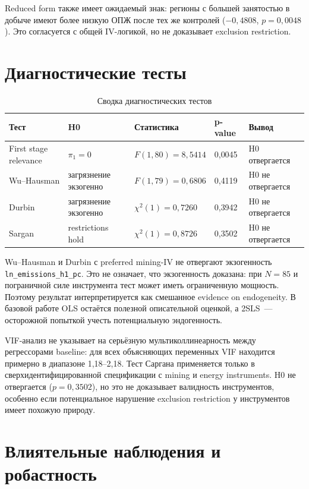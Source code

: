 \documentclass[11pt,a4paper]{article}
\begin{document}
Reduced form также имеет ожидаемый знак: регионы с большей занятостью в добыче имеют более низкую ОПЖ после тех же контролей ($-0{,}4808$, $p=0{,}0048$). Это согласуется с общей IV-логикой, но не доказывает exclusion restriction.

\section{Диагностические тесты}

\begin{table}[H]
\centering
\caption{Сводка диагностических тестов}
\label{tab:tests}
\small
\setlength{\tabcolsep}{3pt}
\begin{tabular}{p{}p{}p{}p{}p{}}
\toprule
\textbf{Тест} & \textbf{H0} & \textbf{Статистика} & \textbf{p-value} & \textbf{Вывод} \\
\midrule
First stage relevance & $\pi_1=0$ & $F(1,80)=8{,}5414$ & 0{,}0045 & H0 отвергается \\
Wu--Hausman & загрязнение экзогенно & $F(1,79)=0{,}6806$ & 0{,}4119 & H0 не отвергается \\
Durbin & загрязнение экзогенно & $\chi^2(1)=0{,}7260$ & 0{,}3942 & H0 не отвергается \\
Sargan & restrictions hold & $\chi^2(1)=0{,}8726$ & 0{,}3502 & H0 не отвергается \\
\bottomrule
\end{tabular}
\end{table}

Wu--Hausman и Durbin с preferred mining-IV не отвергают экзогенность \texttt{ln\_emissions\_h1\_pc}. Это не означает, что экзогенность доказана: при $N=85$ и пограничной силе инструмента тест может иметь ограниченную мощность. Поэтому результат интерпретируется как смешанное evidence on endogeneity. В базовой работе OLS остаётся полезной описательной оценкой, а 2SLS~--- осторожной попыткой учесть потенциальную эндогенность.

VIF-анализ не указывает на серьёзную мультиколлинеарность между регрессорами baseline: для всех объясняющих переменных VIF находится примерно в диапазоне 1{,}18--2{,}18. Тест Саргана применяется только в сверхидентифицированной спецификации с mining и energy instruments. H0 не отвергается ($p=0{,}3502$), но это не доказывает валидность инструментов, особенно если потенциальное нарушение exclusion restriction у инструментов имеет похожую природу.

\section{Влиятельные наблюдения и робастность}
\end{document}
